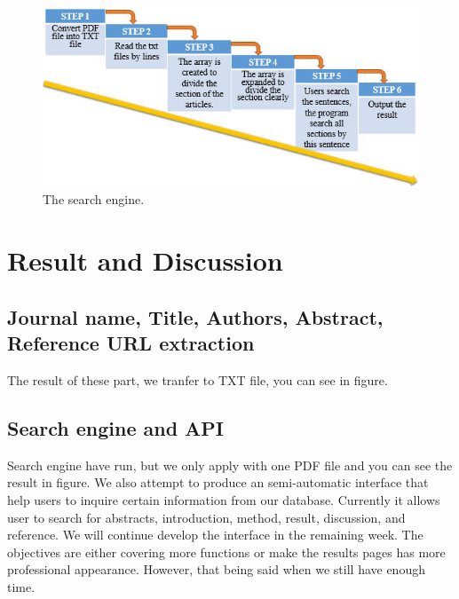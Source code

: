 \begin{figure}[tbh]
	\begin{center}
		\includegraphics[width=\columnwidth]{Union_Method_Chart_Search engine}
	\end{center}
	\caption{The search engine.}
	\end{figure}
	
\section*{Result and Discussion}
	\subsection*{Journal name, Title, Authors, Abstract, Reference URL extraction}
	The result of these part, we tranfer to TXT file, you can see in figure.
	
	\subsection*{Search engine and API}
	Search engine have run, but we only apply with one PDF file and you can see the result in figure. 
	We also attempt to produce an semi-automatic interface that help users to inquire certain information from our database. 
	Currently it allows user to search for abstracts, introduction, method, result, discussion, and reference. 
	We will continue develop the interface in the remaining week. 
	The objectives are either covering more functions or make the results pages has more professional appearance. 
	However, that being said when we still have enough time.
